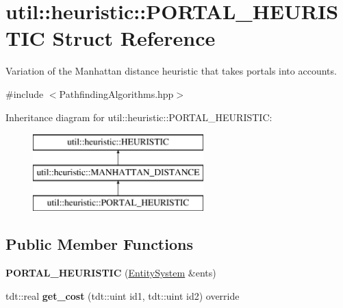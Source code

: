 \hypertarget{structutil_1_1heuristic_1_1_p_o_r_t_a_l___h_e_u_r_i_s_t_i_c}{}\section{util\+:\+:heuristic\+:\+:P\+O\+R\+T\+A\+L\+\_\+\+H\+E\+U\+R\+I\+S\+T\+IC Struct Reference}
\label{structutil_1_1heuristic_1_1_p_o_r_t_a_l___h_e_u_r_i_s_t_i_c}


Variation of the Manhattan distance heuristic that takes portals into accounts.  




{\ttfamily \#include $<$Pathfinding\+Algorithms.\+hpp$>$}

Inheritance diagram for util\+:\+:heuristic\+:\+:P\+O\+R\+T\+A\+L\+\_\+\+H\+E\+U\+R\+I\+S\+T\+IC\+:\begin{figure}[H]
\begin{center}
\leavevmode
\includegraphics[height=3.000000cm]{structutil_1_1heuristic_1_1_p_o_r_t_a_l___h_e_u_r_i_s_t_i_c}
\end{center}
\end{figure}
\subsection*{Public Member Functions}
\begin{DoxyCompactItemize}
\item 
{\bfseries P\+O\+R\+T\+A\+L\+\_\+\+H\+E\+U\+R\+I\+S\+T\+IC} (\hyperlink{class_entity_system}{Entity\+System} \&ents)\hypertarget{structutil_1_1heuristic_1_1_p_o_r_t_a_l___h_e_u_r_i_s_t_i_c_a845d5561ba3d903c2518b28300e2ba49}{}\label{structutil_1_1heuristic_1_1_p_o_r_t_a_l___h_e_u_r_i_s_t_i_c_a845d5561ba3d903c2518b28300e2ba49}

\item 
tdt\+::real {\bfseries get\+\_\+cost} (tdt\+::uint id1, tdt\+::uint id2) override\hypertarget{structutil_1_1heuristic_1_1_p_o_r_t_a_l___h_e_u_r_i_s_t_i_c_a63bd677b75d03ac3d26b47e56eaf7ce6}{}\label{structutil_1_1heuristic_1_1_p_o_r_t_a_l___h_e_u_r_i_s_t_i_c_a63bd677b75d03ac3d26b47e56eaf7ce6}

\end{DoxyCompactItemize}
